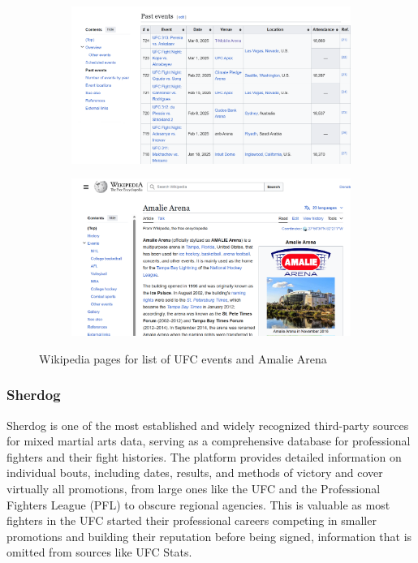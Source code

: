 \documentclass[12pt,twoside]{report}
\begin{document}
\begin{figure}[htb]
\centering
\begin{subfigure}{.5\linewidth}
  \centering
  \includegraphics[width=0.95\linewidth]{figures/wikipedia1.png}
\end{subfigure}%
\begin{subfigure}{.5\linewidth}
  \centering
  \includegraphics[width=0.95\linewidth]{figures/wikipedia2.png}
\end{subfigure}
\caption{Wikipedia pages for list of UFC events and Amalie Arena}
\end{figure}

\subsubsection{Sherdog}

Sherdog is one of the most established and widely recognized third-party sources for mixed martial arts data, serving as a comprehensive database for professional fighters and their fight histories. The platform provides detailed information on individual bouts, including dates, results, and methods of victory and cover virtually all promotions, from large ones like the UFC and the Professional Fighters League (PFL) to obscure regional agencies. This is valuable as most fighters in the UFC started their professional careers competing in smaller promotions and building their reputation before being signed, information that is omitted from sources like UFC Stats.
\end{document}
